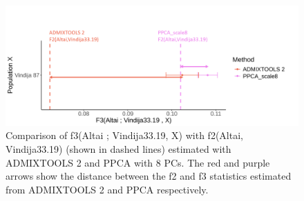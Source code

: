 \documentclass[12pt, letterpaper]{article}
\begin{document}
\begin{figure}[ht!]
    \includegraphics[width=16.5cm]{Images/Supplement/f2_f3.png}
    \centering
    \caption{Comparison of f3(Altai ; Vindija33.19, X) with f2(Altai, Vindija33.19) (shown in dashed lines) estimated with ADMIXTOOLS 2 and PPCA with 8 PCs. The red and purple arrows show the distance between the f2 and f3 statistics estimated from ADMIXTOOLS 2 and PPCA respectively.} 
    \label{figS2:pc_scale}
\end{figure}
\end{document}
